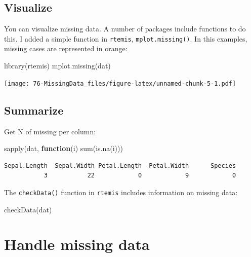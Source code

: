 \documentclass[
]{book}
\newenvironment{Shaded}{\begin{snugshade}}{\end{snugshade}}
\newcommand{\ControlFlowTok}[1]{\textcolor[rgb]{0.13,0.29,0.53}{\textbf{#1}}}
\newcommand{\FunctionTok}[1]{\textcolor[rgb]{0.00,0.00,0.00}{#1}}
\newcommand{\NormalTok}[1]{#1}
\begin{document}
\hypertarget{visualize}{%
\subsection{Visualize}\label{visualize}}

You can visualize missing data. A number of packages include functions to do this. I added a simple function in \texttt{rtemis}, \texttt{mplot.missing()}. In this examples, missing cases are represented in orange:

\begin{Shaded}
\begin{Highlighting}[]
\FunctionTok{library}\NormalTok{(rtemis)}
\FunctionTok{mplot.missing}\NormalTok{(dat)}
\end{Highlighting}
\end{Shaded}

\texttt{[image: 76-MissingData\_files/figure-latex/unnamed-chunk-5-1.pdf]}

\hypertarget{summarize-1}{%
\subsection{Summarize}\label{summarize-1}}

Get N of missing per column:

\begin{Shaded}
\begin{Highlighting}[]
\FunctionTok{sapply}\NormalTok{(dat, }\ControlFlowTok{function}\NormalTok{(i) }\FunctionTok{sum}\NormalTok{(}\FunctionTok{is.na}\NormalTok{(i)))}
\end{Highlighting}
\end{Shaded}

\begin{verbatim}
Sepal.Length  Sepal.Width Petal.Length  Petal.Width      Species 
           3           22            0            9            0 
\end{verbatim}

The \texttt{checkData()} function in \texttt{rtemis} includes information on missing data:

\begin{Shaded}
\begin{Highlighting}[]
\FunctionTok{checkData}\NormalTok{(dat)}
\end{Highlighting}
\end{Shaded}

\hypertarget{handle-missing-data}{%
\section{Handle missing data}\label{handle-missing-data}}
\end{document}

